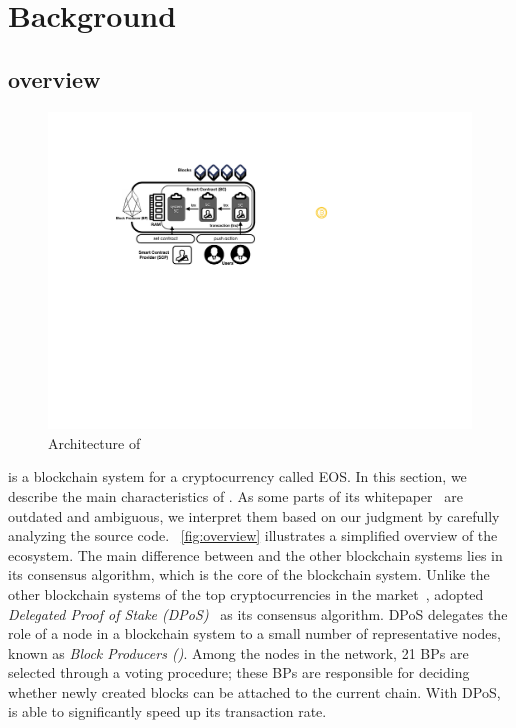 \chapter{Background}
\label{s:back}

\section{\eos overview}
\label{ss:overview}

\begin{figure}[!t]
  \includegraphics[width=\linewidth]{figures/philosophy.pdf}
  \caption{Architecture of \PLATFORM}
  \label{fig:overview}
\end{figure}

\eos is a blockchain system for a cryptocurrency called EOS. In this section, we
describe the main characteristics of \eos. As some parts of its
whitepaper~\cite{EOSWHITEPAPER} are outdated and ambiguous, we interpret them
based on our judgment by carefully analyzing the \eos source code.
%
~\autoref{fig:overview} illustrates a simplified overview of the \eos ecosystem.
%
The main difference between \eos and the other blockchain systems lies in its
consensus algorithm, which is the core of the blockchain system.
%
Unlike the other blockchain systems of the top cryptocurrencies in the
market~\cite{coincap}, \eos adopted \textit{Delegated Proof of Stake
(DPoS)}~\cite{larimer2014delegated} as its consensus algorithm. DPoS delegates
the role of a node in a blockchain system to a small number of representative
nodes, known as \textit{Block Producers (\BPs)}.
%
Among the nodes in the \eos network, 21 BPs are selected through a voting
procedure; these BPs are responsible for deciding whether newly created blocks
can be attached to the current chain.
%
With DPoS, \eos is able to significantly speed up its transaction rate.

